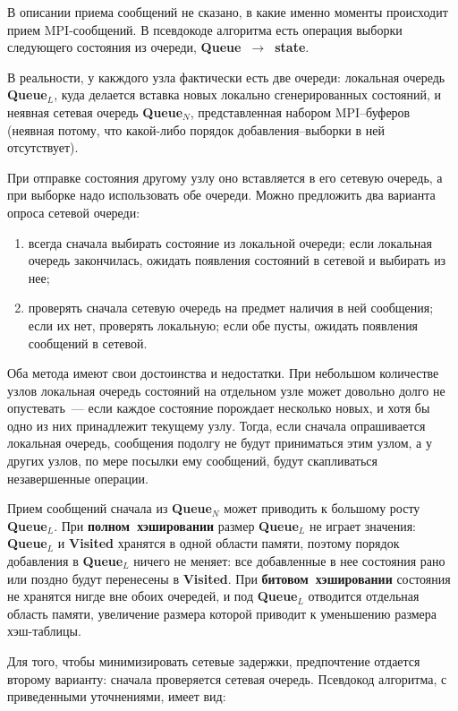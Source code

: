 \documentclass[12pt,a4paper,fleqn]{article}
\newcommand{\Code}[1]{\textbf{\mbox{#1}}}
\begin{document}
В описании приема сообщений не сказано, в какие именно моменты происходит прием MPI-сообщений. В
псевдокоде алгоритма есть операция выборки следующего состояния из очереди, \Code{Queue
  $\rightarrow$ state}.

В реальности, у какждого узла фактически есть две очереди: локальная очередь \Code{Queue$_L$}, куда
делается вставка новых локально сгенерированных состояний, и неявная сетевая очередь
\Code{Queue$_N$}, представленная набором MPI--буферов (неявная потому, что какой-либо порядок
добавления--выборки в ней отсутствует).

При отправке состояния другому узлу оно вставляется в его сетевую очередь, а при выборке надо
использовать обе очереди. Можно предложить два варианта опроса сетевой очереди:
\begin{enumerate}
\item всегда сначала выбирать состояние из локальной очереди; если локальная очередь закончилась,
  ожидать появления состояний в сетевой и выбирать из нее;
\item проверять сначала сетевую очередь на предмет наличия в ней сообщения; если их нет, проверять
  локальную; если обе пусты, ожидать появления сообщений в сетевой.
\end{enumerate}

Оба метода имеют свои достоинства и недостатки. При небольшом количестве узлов локальная очередь
состояний на отдельном узле может довольно долго не опустевать~--- если каждое состояние порождает
несколько новых, и хотя бы одно из них принадлежит текущему узлу. Тогда, если сначала опрашивается
локальная очередь, сообщения подолгу не будут приниматься этим узлом, а у других узлов, по мере
посылки ему сообщений, будут скапливаться незавершенные операции.

Прием сообщений сначала из \Code{Queue$_N$} может приводить к большому росту \Code{Queue$_L$}. При
\Code{полном хэшировании} размер \Code{Queue$_L$} не играет значения: \Code{Queue$_L$} и
\Code{Visited} хранятся в одной области памяти, поэтому порядок добавления в \Code{Queue$_L$} ничего
не меняет: все добавленные в нее состояния рано или поздно будут перенесены в \Code{Visited}. При
\Code{битовом хэшировании} состояния не хранятся нигде вне обоих очередей, и под \Code{Queue$_L$}
отводится отдельная область памяти, увеличение размера которой приводит к уменьшению размера
хэш-таблицы.

Для того, чтобы минимизировать сетевые задержки, предпочтение отдается второму варианту: сначала
проверяется сетевая очередь. Псевдокод алгоритма, с приведенными уточнениями, имеет вид:
\end{document}
